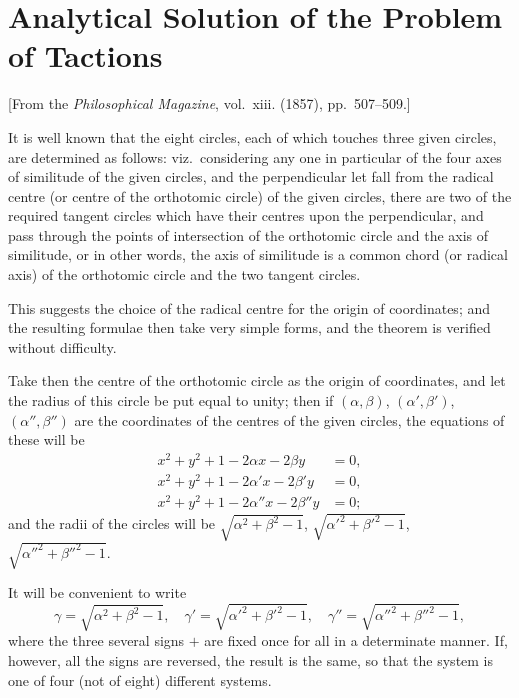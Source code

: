 \documentclass[11pt,a4paper]{book}
\begin{document}
\section{Analytical Solution of the Problem of Tactions}
\label{sec:207}

[From the \textit{Philosophical Magazine}, vol.~xiii. (1857), pp.~507--509.]
\vspace{1em}

It is well known that the eight circles, each of which touches three given circles, are determined as follows: viz.\ considering any one in particular of the four axes of similitude of the given circles, and the perpendicular let fall from the radical centre (or centre of the orthotomic circle) of the given circles, there are two of the required tangent circles which have their centres upon the perpendicular, and pass through the points of intersection of the orthotomic circle and the axis of similitude, or in other words, the axis of similitude is a common chord (or radical axis) of the orthotomic circle and the two tangent circles.

This suggests the choice of the radical centre for the origin of coordinates; and the resulting formulae then take very simple forms, and the theorem is verified without difficulty.

Take then the centre of the orthotomic circle as the origin of coordinates, and let the radius of this circle be put equal to unity; then if $(\alpha, \beta)$, $(\alpha', \beta')$, $(\alpha'', \beta'')$ are the coordinates of the centres of the given circles, the equations of these will be
\begin{align*}
x^2 + y^2 + 1 - 2\alpha x - 2\beta y &= 0, \\
x^2 + y^2 + 1 - 2\alpha' x - 2\beta' y &= 0, \\
x^2 + y^2 + 1 - 2\alpha'' x - 2\beta'' y &= 0;
\end{align*}
and the radii of the circles will be $\sqrt{\alpha^2 + \beta^2 - 1}$, $\sqrt{\alpha'^2 + \beta'^2 - 1}$, $\sqrt{\alpha''^2 + \beta''^2 - 1}$.

It will be convenient to write
\[
\gamma = \sqrt{\alpha^2 + \beta^2 - 1}, \quad \gamma' = \sqrt{\alpha'^2 + \beta'^2 - 1}, \quad \gamma'' = \sqrt{\alpha''^2 + \beta''^2 - 1},
\]
where the three several signs $+$ are fixed once for all in a determinate manner. If, however, all the signs are reversed, the result is the same, so that the system is one of four (not of eight) different systems.
\end{document}
